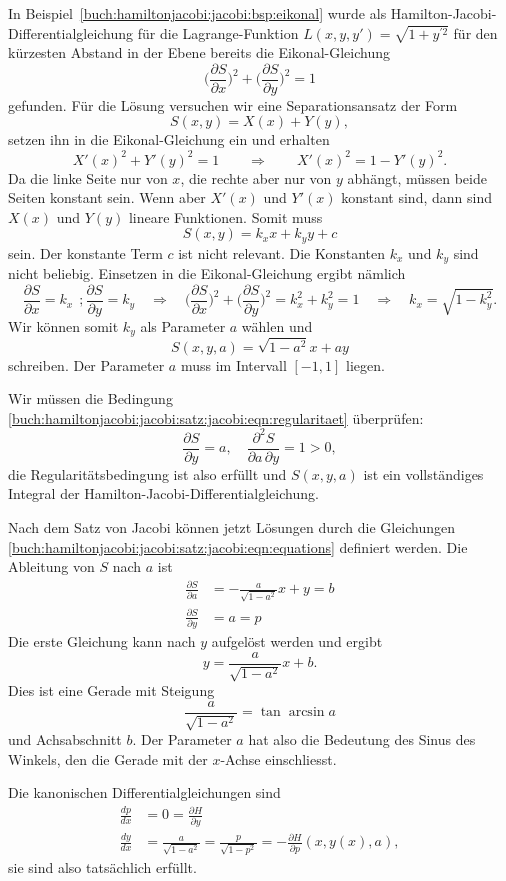 \begin{beispiel}
In Beispiel~\ref{buch:hamiltonjacobi:jacobi:bsp:eikonal} wurde als
Hamilton-Jacobi-Differentialgleichung für die Lagrange-Funktion
$L(x,y,y')=\sqrt{1+y^{\prime 2}}$ für den kürzesten Abstand in der
Ebene bereits die Eikonal-Gleichung
\[
\biggl(\frac{\partial S}{\partial x}\biggr)^2
+
\biggl(\frac{\partial S}{\partial y}\biggr)^2
=
1
\]
gefunden.
Für die Lösung versuchen wir eine Separationsansatz der Form
\[
S(x,y) = X(x) + Y(y),
\]
setzen ihn in die Eikonal-Gleichung ein und erhalten
\[
X'(x)^2 + Y'(y)^2 = 1
\qquad\Rightarrow\qquad
X'(x)^2 = 1 - Y'(y)^2.
\]
Da die linke Seite nur von $x$, die rechte aber nur von $y$ abhängt,
müssen beide Seiten konstant sein.
Wenn aber $X'(x)$ und $Y'(x)$ konstant sind, dann sind $X(x)$ und $Y(y)$
lineare Funktionen.
Somit muss
\[
S(x,y) = k_xx + k_yy + c
\]
sein.
Der konstante Term $c$ ist nicht relevant.
Die Konstanten $k_x$ und $k_y$ sind nicht beliebig.
Einsetzen in die Eikonal-Gleichung ergibt nämlich
\[
\frac{\partial S}{\partial x} = k_x
\,\;;
\frac{\partial S}{\partial y} = k_y
\quad\Rightarrow\quad
\biggl(\frac{\partial S}{\partial x}\biggr)^2
+
\biggl(\frac{\partial S}{\partial y}\biggr)^2
=
k_x^2 + k_y^2 = 1
\quad\Rightarrow\quad
k_x = \sqrt{1-k_y^2}.
\]
Wir können somit $k_y$ als Parameter $a$ wählen und
\[
S(x,y,a)
=
\sqrt{1-a^2}x+ay
\]
schreiben.
Der Parameter $a$ muss im Intervall $[-1,1]$ liegen.

Wir müssen die Bedingung
\eqref{buch:hamiltonjacobi:jacobi:satz:jacobi:eqn:regularitaet}
überprüfen:
\[
\frac{\partial S}{\partial y}
=
a,
\quad
\frac{\partial^2 S}{\partial a\,\partial y}
=
1
>
0,
\]
die Regularitätsbedingung ist also erfüllt und $S(x,y,a)$ ist ein
vollständiges Integral der Hamilton-Jacobi-Differentialgleichung.

Nach dem Satz von Jacobi können jetzt Lösungen durch die Gleichungen
\eqref{buch:hamiltonjacobi:jacobi:satz:jacobi:eqn:equations}
definiert werden.
Die Ableitung von $S$ nach $a$ ist
\begin{align*}
\frac{\partial S}{\partial a}
&=
-
\frac{a}{\sqrt{1-a^2}}
x
+
y
=
b
\\
\frac{\partial S}{\partial y}
&=
a
=
p
\end{align*}
Die erste Gleichung kann nach $y$ aufgelöst werden und ergibt
\[
y
=
\frac{a}{\sqrt{1-a^2}} x + b.
\]
Dies ist eine Gerade mit Steigung 
\[
\frac{a}{\sqrt{1-a^2}}
=
\tan\arcsin a
\]
und Achsabschnitt $b$.
Der Parameter $a$ hat also die Bedeutung des Sinus des Winkels, den die
Gerade mit der $x$-Achse einschliesst.

Die kanonischen Differentialgleichungen sind
\begin{align*}
\frac{dp}{dx}
&=
0
=
\frac{\partial H}{\partial y}
\\
\frac{dy}{dx}
&=
\frac{a}{\sqrt{1-a^2}}
=
\frac{p}{\sqrt{1-p^2}}
=
-\frac{\partial H}{\partial p}(x,y(x),a),
\end{align*}
sie sind also tatsächlich erfüllt.
\end{beispiel}

